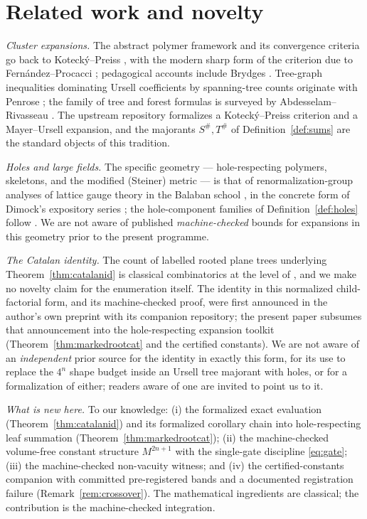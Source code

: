 \documentclass[11pt]{article}
\begin{document}
\section{Related work and novelty}\label{sec:related}

\emph{Cluster expansions.}  The abstract polymer framework and its
convergence criteria go back to Kotecký--Preiss \cite{KP86}, with the
modern sharp form of the criterion due to Fernández--Procacci
\cite{FP07}; pedagogical accounts include Brydges \cite{Brydges86}.
Tree-graph inequalities dominating Ursell coefficients by
spanning-tree counts originate with Penrose \cite{Penrose67}; the
family of tree and forest formulas is surveyed by
Abdesselam--Rivasseau \cite{AR95}.  The upstream repository
formalizes a Kotecký--Preiss criterion and a Mayer--Ursell expansion,
and the majorants $S^\#, T^\#$ of Definition~\ref{def:sums} are the
standard objects of this tradition.

\emph{Holes and large fields.}  The specific geometry ---
hole-respecting polymers, skeletons, and the modified (Steiner)
metric --- is that of renormalization-group analyses of lattice gauge
theory in the Balaban school \cite{Balaban87}, in the concrete form
of Dimock's expository series \cite{DimockI,DimockII,DimockIII}; the
hole-component families of Definition~\ref{def:holes} follow
\cite[\S 3.1.2]{DimockII}.  We are not aware of published
\emph{machine-checked} bounds for expansions in this geometry prior
to the present programme.

\emph{The Catalan identity.}  The count of labelled rooted plane
trees underlying Theorem~\ref{thm:catalanid} is classical
combinatorics at the level of \cite{Stanley15}, and we make no
novelty claim for the enumeration itself.  The identity in this
normalized child-factorial form, and its machine-checked proof, were
first announced in the author's own preprint \cite{Eriksson26} with
its companion repository; the present paper subsumes that
announcement into the hole-respecting expansion toolkit
(Theorem~\ref{thm:markedrootcat} and the certified constants).  We
are not aware of an \emph{independent} prior source for the identity
in exactly this form, for its use to replace the $4^n$ shape budget
inside an Ursell tree majorant with holes, or for a formalization of
either; readers aware of one are invited to point us to it.

\emph{What is new here.}  To our knowledge: (i) the formalized exact
evaluation (Theorem~\ref{thm:catalanid}) and its formalized corollary
chain into hole-respecting leaf summation
(Theorem~\ref{thm:markedrootcat}); (ii) the machine-checked
volume-free constant structure $M^{2n+1}$ with the single-gate
discipline \eqref{eq:gate}; (iii) the machine-checked non-vacuity
witness; and (iv) the certified-constants companion with committed
pre-registered bands and a documented registration failure
(Remark~\ref{rem:crossover}).  The mathematical ingredients are
classical; the contribution is the machine-checked integration.
\end{document}
